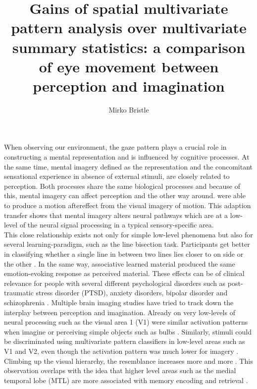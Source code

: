 \documentclass[a4paper,man,natbib,floatsintext]{apa6}
\title{Gains of spatial multivariate pattern analysis over multivariate summary statistics: a comparison of eye movement between perception and imagination}
\author{Mirko Bristle}
\affiliation{
Division of Cognitive Psychology, Perception and Research Methods\\
Department of Psychology\\
University of Bern }
\begin{document}
\maketitle
When observing our environment, the gaze pattern plays a crucial role in constructing a mental representation and is influenced by cognitive processes\citep{Hayhoe2005}. At the same time, mental imagery defined as the representation and the concomitant sensational experience in absence of external stimuli, are closely related to perception. Both processes share the same biological processes and because of this, mental imagery can affect perception and the other way around. \cite{Winawer2010} were able to produce a motion aftereffect from the visual imagery of motion. This adaption transfer shows that mental imagery alters neural pathways which are at a low-level of the neural signal processing in a typical sensory-specific area.\\
This close relationship exists not only for simple low-level phenomena but also for several learning-paradigm, such as the line bisection task. Participants get better in classifying whether a single line in between two lines lies closer to on side or the other \citep{Tartaglia2009}. In the same way, associative learned material produced the same emotion-evoking response as perceived material\citep{Lewis2013}. These effects can be of clinical relevance for people with several different psychological disorders such as post-traumatic stress disorder (PTSD), anxiety disorders, bipolar disorder and schizophrenia \citep{Holmes2010}.
Multiple brain imaging studies have tried to track down the interplay between perception and imagination. Already on very low-levels of neural processing such as the visual area 1 (V1)  were similar activation patterns when imagine or perceiving simple objects such as bulbs \citep{Bergmann2016}. Similarly, stimuli could be discriminated using multivariate pattern classifiers in low-level areas such as  V1 and V2, even though the activation pattern was much lower for imagery \citep{Cichy2012, Lee2012}. Climbing up the visual hierarchy, the resemblance increases more and more \citep{Stokes2009}. This observation overlaps with the idea that higher level areas such as the medial temporal lobe (MTL) are more associated with memory encoding and retrieval \citep{Reddy2010, Johnson2014}. \\
\end{document}
